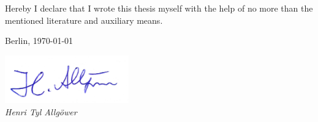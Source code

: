 \newpage

\thispagestyle{empty}

\begin{large}

\vspace*{6cm}

\noindent
Hereby I declare that I wrote this thesis myself with the help of no more than the mentioned literature and auxiliary means.
\vspace{2cm}

\noindent
Berlin, \today

\vspace{3cm}

\hspace*{7cm}%
\includegraphics[width=0.4\textwidth]{./img/Unterschrift.jpg}
\hspace*{-6cm}%
\dotfill\\
\hspace*{7.5cm}%
\textit{Henri Tyl Allgöwer}

\end{large}
